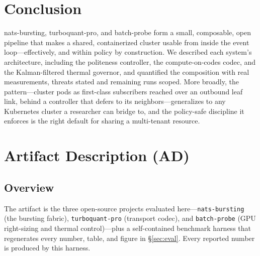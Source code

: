 \documentclass[conference]{IEEEtran}
\begin{document}
\section{Conclusion}
nats-bursting, turboquant-pro, and batch-probe form a small, composable, open pipeline that makes
a shared, containerized cluster usable from inside the event loop---effectively, and within
policy by construction. We described each system's architecture, including the politeness
controller, the compute-on-codes codec, and the Kalman-filtered thermal governor, and quantified
the composition with real measurements, threats stated and remaining runs scoped. More broadly,
the pattern---cluster pods as first-class subscribers reached over an outbound leaf link, behind a
controller that defers to its neighbors---generalizes to any Kubernetes cluster a researcher can
bridge to, and the policy-safe discipline it enforces is the right default for sharing a
multi-tenant resource.

\appendices
\section{Artifact Description (AD)}\label{sec:ad}

\subsection{Overview}
The artifact is the three open-source projects evaluated here---\texttt{nats-bursting}
(the bursting fabric), \texttt{turboquant-pro} (transport codec), and \texttt{batch-probe}
(GPU right-sizing and thermal control)---plus a self-contained benchmark harness that
regenerates every number, table, and figure in \S\ref{sec:eval}. Every reported number is
produced by this harness.
\end{document}
